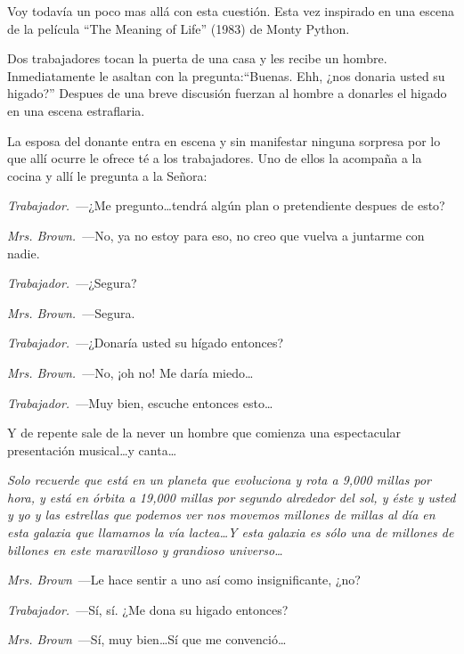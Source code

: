 \documentclass[10pt]{article}
\begin{document}
       Voy todavía un poco mas allá con esta cuestión. Esta vez inspirado en una
       escena de la película ``The Meaning of Life'' (1983) de Monty Python.
       \begin{adjustwidth}{1.2cm}{}
         Dos trabajadores tocan la puerta de una casa y les recibe un hombre.
         Inmediatamente le asaltan con la pregunta:``Buenas. Ehh, ¿nos donaria
         usted su higado?'' Despues de una breve discusión fuerzan al hombre a
         donarles el higado en una escena estraflaria.

         La esposa del donante entra en escena y sin manifestar ninguna sorpresa
         por lo que allí ocurre le ofrece té a los trabajadores. Uno de ellos la
         acompaña a la cocina y allí le pregunta a la Señora:

         \noindent\emph{Trabajador.}~---¿Me pregunto\ldots tendrá algún plan o
         pretendiente despues de esto?

         \noindent\emph{Mrs. Brown.}~---No, ya no estoy para eso, no creo que
         vuelva a juntarme con nadie.

         \noindent\emph{Trabajador.}~---¿Segura?

         \noindent\emph{Mrs. Brown.}~---Segura.

         \noindent\emph{Trabajador.}~---¿Donaría usted su hígado entonces?

         \noindent\emph{Mrs. Brown.}~---No, ¡oh no! Me daría miedo\ldots

         \noindent\emph{Trabajador.}~---Muy bien, escuche entonces esto\ldots

         Y de repente sale de la never un hombre que comienza una espectacular
         presentación musical\ldots y canta\ldots

         \emph{Solo recuerde que está en un planeta que evoluciona y rota a
           9,000 millas por hora, y está en órbita a 19,000 millas por segundo
           alrededor del sol, y éste y usted y yo y las estrellas que podemos
           ver nos movemos millones de millas al día en esta galaxia que
           llamamos la vía lactea\ldots Y esta galaxia es sólo una de millones
           de billones en este maravilloso y grandioso universo\ldots}

         \noindent\emph{Mrs. Brown}~---Le hace sentir a uno así como
         insignificante, ¿no?

         \noindent\emph{Trabajador.}~---Sí, sí. ¿Me dona su higado entonces?

         \noindent\emph{Mrs. Brown}~---Sí, muy bien\ldots Sí que me
         convenció\ldots

       \end{adjustwidth}
\end{document}
